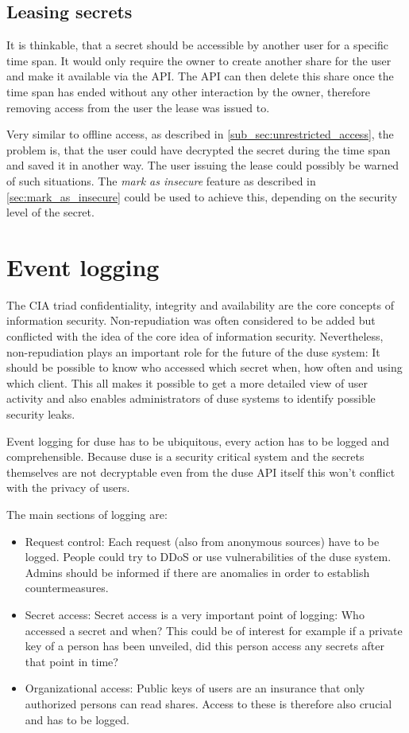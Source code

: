 \subsection{Leasing secrets}
\label{sec:leasing_secrets}

It is thinkable, that a secret should be accessible by another user for a
specific time span. It would only require the owner to create another share for
the user and make it available via the API. The API can then delete this share
once the time span has ended without any other interaction by the owner,
therefore removing access from the user the lease was issued to.

Very similar to offline access, as described in
\ref{sub_sec:unrestricted_access}, the problem is, that the user could have
decrypted the secret during the time span and saved it in another way. The user
issuing the lease could possibly be warned of such situations. The
\textit{mark as insecure} feature as described in \ref{sec:mark_as_insecure}
could be used to achieve this, depending on the security level of the secret.

\section{Event logging}
\label{sec:event_logging}

The CIA triad confidentiality, integrity and availability are the core
concepts of information security. Non-repudiation was often considered
to be added but conflicted with the idea of the core idea of information
security. Nevertheless, non-repudiation plays an important role for the
future of the duse system: It should be possible to know who accessed
which secret when, how often and using which client. This all makes it
possible to get a more detailed view of user activity and also enables
administrators of duse systems to identify possible security leaks.

Event logging for duse has to be ubiquitous, every action has to be
logged and comprehensible. Because duse is a security critical system
and the secrets themselves are not decryptable even from the duse API
itself this won't conflict with the privacy of users.

The main sections of logging are:
\begin{itemize}
  \item Request control: Each request (also from anonymous sources) have
  to be logged. People could try to DDoS or use vulnerabilities of the
  duse system. Admins should be informed if there are anomalies in order
  to establish countermeasures.

  \item Secret access: Secret access is a very important point of logging:
  Who accessed a secret and when? This could be of interest for example if
  a private key of a person has been unveiled, did this person access any
  secrets after that point in time?

  \item Organizational access: Public keys of users are an insurance that
  only authorized persons can read shares. Access to these is therefore
  also crucial and has to be logged.
\end{itemize}

